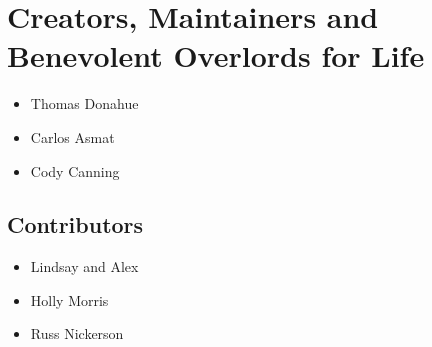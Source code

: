 \documentclass[11pt]{article}
\begin{document}
\section{Creators, Maintainers and Benevolent Overlords for Life}
\label{sec-4}

\begin{itemize}
\item Thomas Donahue
\item Carlos Asmat
\item Cody Canning
\end{itemize}
\subsection{Contributors}
\label{sec-4-1}

\begin{itemize}
\item Lindsay and Alex
\item Holly Morris
\item Russ Nickerson
\end{itemize}
  
\end{document}
